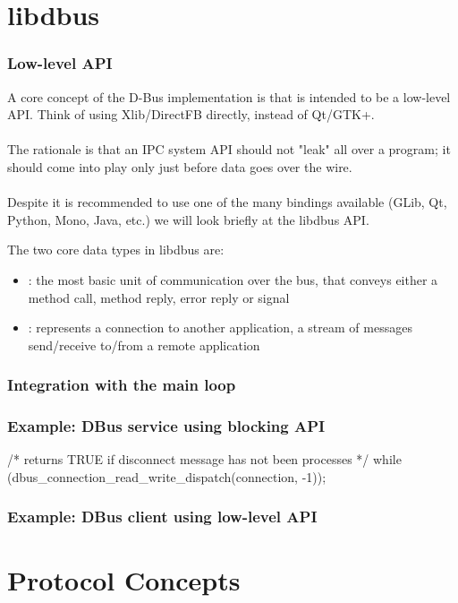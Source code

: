 \documentclass[xcolor=dvipsnames,compress]{beamer}
\begin{document}
\section[lib]{libdbus}
\begin{frame}
    \frametitle{Low-level API}
    A core concept of the D-Bus implementation is that  is intended to be a low-level API. 
    Think of using Xlib/DirectFB directly, instead of Qt/GTK+.\\~\\
    The rationale is that an IPC system API should not "leak" all over a program; 
    it should come into play only just before data goes over the wire.\\~\\
    Despite it is recommended to use one of the many bindings available (GLib, Qt, Python, Mono, Java, etc.)
    we will look briefly at the libdbus API.
\end{frame}
\begin{frame}
    The two core data types in libdbus are:
    \begin{itemize}
    \item {}: the most basic unit of communication over the bus, that conveys either 
    a method call, method reply, error reply or signal
    \item {}: represents a connection to another application, a stream of messages
    send/receive to/from a remote application
    \end{itemize}
\end{frame}
\begin{frame}
    \frametitle{Integration with the main loop}
\end{frame}

\begin{frame}[fragile]
    \frametitle{Example: DBus service using blocking API}
    \begin{ccode}
    /* returns TRUE if disconnect message has not been processes */
    while (dbus_connection_read_write_dispatch(connection, -1));
    \end{ccode}
\end{frame}

\begin{frame}
    \frametitle{Example: DBus client using low-level API}
\end{frame}

\section[protocol]{Protocol Concepts}
\end{document}
